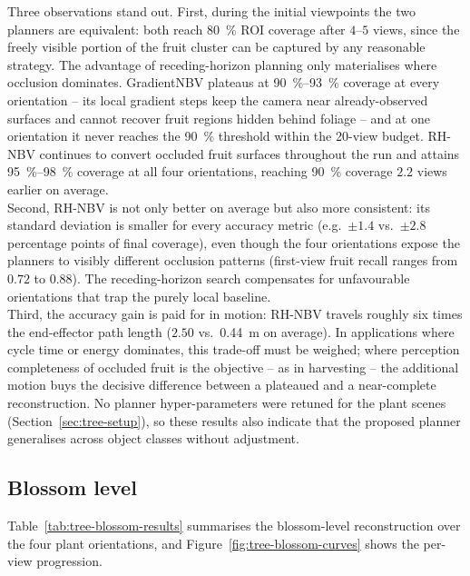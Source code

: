Three observations stand out. First, during the initial viewpoints the two
planners are equivalent: both reach \SI{80}{\percent} ROI coverage after
$4$--$5$ views, since the freely visible portion of the fruit cluster can be
captured by any reasonable strategy. The advantage of receding-horizon
planning only materialises where occlusion dominates. GradientNBV plateaus at
\SIrange{90}{93}{\percent} coverage at every orientation -- its local
gradient steps keep the camera near already-observed surfaces and cannot
recover fruit regions hidden behind foliage -- and at one orientation it
never reaches the \SI{90}{\percent} threshold within the 20-view budget.
RH-NBV continues to convert occluded fruit surfaces throughout the run and
attains \SIrange{95}{98}{\percent} coverage at all four orientations,
reaching \SI{90}{\percent} coverage $2.2$ views earlier on average.\\

Second, RH-NBV is not only better on average but also more consistent: its
standard deviation is smaller for every accuracy metric (e.g.\ $\pm 1.4$ vs.\
$\pm 2.8$ percentage points of final coverage), even though the four
orientations expose the planners to visibly different occlusion patterns
(first-view fruit recall ranges from $0.72$ to $0.88$). The receding-horizon
search compensates for unfavourable orientations that trap the purely local
baseline.\\

Third, the accuracy gain is paid for in motion: RH-NBV travels roughly six
times the end-effector path length ($2.50$ vs.\ \SI{0.44}{\metre} on
average). In applications where cycle time or energy dominates, this
trade-off must be weighed; where perception completeness of occluded fruit
is the objective -- as in harvesting -- the additional motion buys the
decisive difference between a plateaued and a near-complete reconstruction.
No planner hyper-parameters were retuned for the plant scenes
(Section~\ref{sec:tree-setup}), so these results also indicate that the proposed
planner generalises across object classes without adjustment.

\subsection{Blossom level}
\label{sec:tree-results-blossom}

Table~\ref{tab:tree-blossom-results} summarises the blossom-level
reconstruction over the four plant orientations, and
Figure~\ref{fig:tree-blossom-curves} shows the per-view progression.

